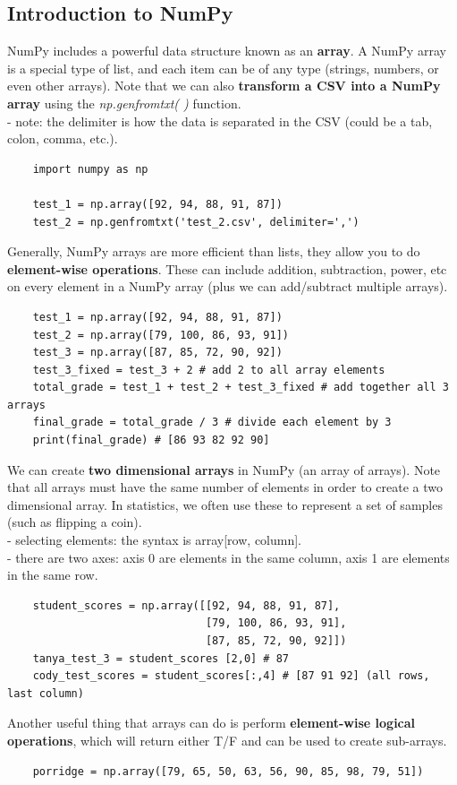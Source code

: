 \documentclass[11pt, a4paper]{article}
\begin{document}
\begin{spacing}{1.1}
	\subsection{Introduction to NumPy}
	NumPy includes a powerful data structure known as an \textbf{array}. A NumPy array is a special type of list, and each item can be of any type (strings, numbers, or even other arrays). Note that we can also \textbf{transform a CSV into a NumPy array} using the \textit{np.genfromtxt( )} function. \\
	\hspace*{3mm} - note: the delimiter is how the data is separated in the CSV (could be a tab, colon, comma, etc.).
	\begin{lstlisting}
	import numpy as np
	
	test_1 = np.array([92, 94, 88, 91, 87])
	test_2 = np.genfromtxt('test_2.csv', delimiter=',') \end{lstlisting}\vspace*{1mm}
	Generally, NumPy arrays are more efficient than lists, they allow you to do \textbf{element-wise operations}. These can include addition, subtraction, power, etc on every element in a NumPy array (plus we can add/subtract multiple arrays). 
	\begin{lstlisting}
	test_1 = np.array([92, 94, 88, 91, 87])
	test_2 = np.array([79, 100, 86, 93, 91])
	test_3 = np.array([87, 85, 72, 90, 92])
	test_3_fixed = test_3 + 2 # add 2 to all array elements
	total_grade = test_1 + test_2 + test_3_fixed # add together all 3 arrays
	final_grade = total_grade / 3 # divide each element by 3
	print(final_grade) # [86 93 82 92 90] \end{lstlisting}\vspace*{1mm}
	We can create \textbf{two dimensional arrays} in NumPy (an array of arrays). Note that all arrays must have the same number of elements in order to create a two dimensional array. In statistics, we often use these to represent a set of samples (such as flipping a coin). \\
	\hspace*{3mm} - selecting elements: the syntax is array[row, column]. \\
	\hspace*{3mm} - there are two axes: axis 0 are elements in the same column, axis 1 are elements in the same row.
	\begin{lstlisting}
	student_scores = np.array([[92, 94, 88, 91, 87],
	                           [79, 100, 86, 93, 91],
	                           [87, 85, 72, 90, 92]])
	tanya_test_3 = student_scores [2,0] # 87
	cody_test_scores = student_scores[:,4] # [87 91 92] (all rows, last column) \end{lstlisting}\vspace*{1mm}
	Another useful thing that arrays can do is perform \textbf{element-wise logical operations}, which will return either T/F and can be used to create sub-arrays. 
	\begin{lstlisting}
	porridge = np.array([79, 65, 50, 63, 56, 90, 85, 98, 79, 51])
	

\end{lstlisting}
\end{spacing}
\end{document}
